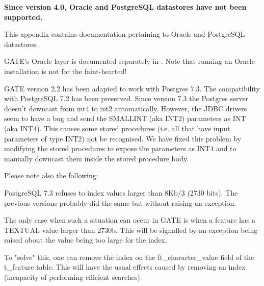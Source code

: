
%
%
%


\nnormalsize

{\bf Since version 4.0, Oracle and PostgreSQL datastores have not been
supported.}

This appendix contains documentation pertaining to Oracle and
PostgreSQL datastores.



GATE's Oracle layer is documented separately in
.
Note that running an Oracle installation is not for the faint-hearted!

GATE version 2.2 has been adapted to work with Postgres 7.3. The compatibility
with PostgreSQL 7.2 has been preserved. Since version 7.3 the Postgres server
doesn't downcast from int4 to int2 automatically. However, the JDBC drivers seem
to have a bug and send the SMALLINT (aka INT2) parameters as INT (aka INT4).
This causes some stored procedures (i.e. all that have input parameters of type
INT2) not be recognised. We have fixed this problem by modifying the stored
procedures to expose the parameters as INT4 and to manually downcast them inside
the stored procedure body.
 
Please note also the following:
 
PostgreSQL 7.3 refuses to index values larger than 8Kb/3 (2730 bits). The
previous versions probably did the same but without raising an exception.

The only case when such a situation can occur in GATE is when a feature has a
TEXTUAL value larger than 2730b. This will be signalled by an exception being
raised about the value being too large for the index.

To "solve" this, one can remove the index on the ft\_character\_value field of the
t\_feature table. This will have the usual effects caused by removing an index
(incapacity of performing efficient searches).


